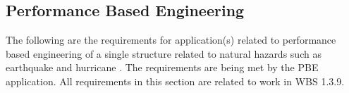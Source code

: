 \documentclass{simcenterdocumentation}
\begin{document}
 

\clearpage
\subsection{Performance Based Engineering}
The following are the requirements for application(s) related to performance based engineering of a single structure related to natural hazards such as earthquake and hurricane . The requirements are being met by the PBE application. All requirements in this section are related to work in WBS 1.3.9.

 


\pagestyle{plain}
{
  \renewcommand{\thispagestyle}[1]{}	
  \printbibliography           
}
\end{document}
